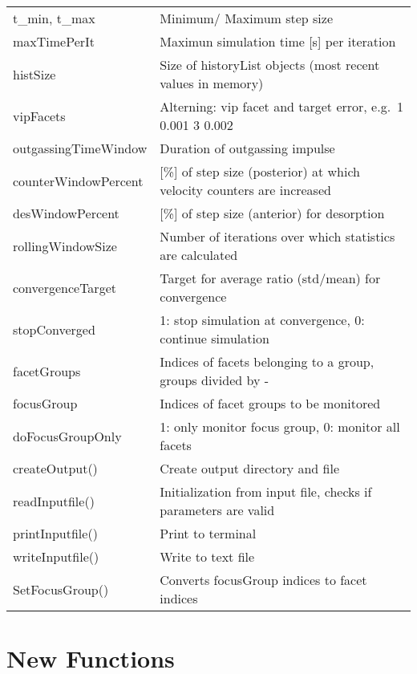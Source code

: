 \begin{center}
\begin{tabular}{|l|l|}
\rule{0pt}{3ex}  t\_min, t\_max&  Minimum/ Maximum step size\\
\rule{0pt}{3ex}  maxTimePerIt&  Maximun simulation time [s] per iteration\\
\rule{0pt}{3ex}  histSize&  Size of historyList objects (most recent values in memory)\\
\rule{0pt}{3ex}  vipFacets&  Alterning: vip facet and target error, e.g.\ 1 0.001 3 0.002\\
\rule{0pt}{3ex}  outgassingTimeWindow&  Duration of outgassing impulse\\
\rule{0pt}{3ex}  counterWindowPercent&  [\%] of step size (posterior) at which velocity counters are increased\\
\rule{0pt}{3ex}  desWindowPercent&  [\%] of step size (anterior) for desorption\\
\rule{0pt}{3ex}  rollingWindowSize&  Number of iterations over which statistics are calculated\\
\rule{0pt}{3ex}  convergenceTarget&  Target for average ratio (std/mean) for convergence\\
\rule{0pt}{3ex}  stopConverged&  1: stop simulation at convergence, 0: continue simulation\\
\rule{0pt}{3ex}  facetGroups&  Indices of facets belonging to a group, groups divided by - \\
\rule{0pt}{3ex}  focusGroup& Indices of facet groups to be monitored\\
\rule{0pt}{3ex} doFocusGroupOnly& 1: only monitor focus group, 0: monitor all facets\\
\hline
\rule{0pt}{3ex} createOutput()& Create output directory and file\\
\rule{0pt}{3ex} readInputfile()& Initialization from input file, checks if parameters are valid\\
\rule{0pt}{3ex} printInputfile()& Print to terminal\\
\rule{0pt}{3ex} writeInputfile()& Write to text file\\
\rule{0pt}{3ex} SetFocusGroup()& Converts focusGroup indices to facet indices\\
\hline
\end{tabular}
\end{center}
\section{New Functions}
